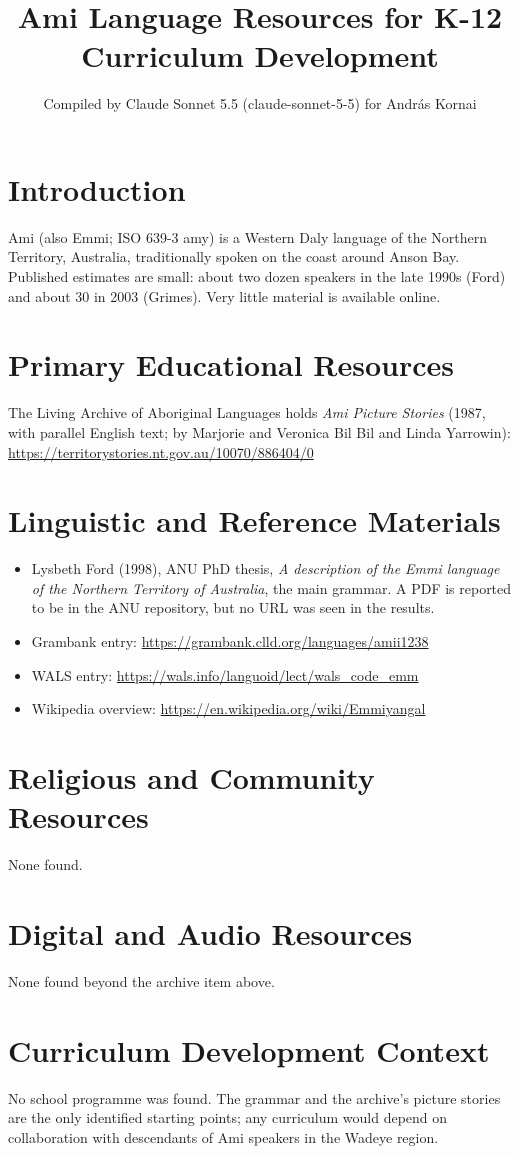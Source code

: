 \documentclass[12pt]{article}
\title{Ami Language Resources for K-12 Curriculum Development}
\author{Compiled by Claude Sonnet 5.5 (claude-sonnet-5-5) for Andr\'as Kornai}
\date{}
\begin{document}
\maketitle

\section{Introduction}
Ami (also Emmi; ISO 639-3 amy) is a Western Daly language of the Northern Territory, Australia, traditionally spoken on the coast around Anson Bay. Published estimates are small: about two dozen speakers in the late 1990s (Ford) and about 30 in 2003 (Grimes). Very little material is available online.

\section{Primary Educational Resources}
The Living Archive of Aboriginal Languages holds \emph{Ami Picture Stories} (1987, with parallel English text; by Marjorie and Veronica Bil Bil and Linda Yarrowin): \url{https://territorystories.nt.gov.au/10070/886404/0}

\section{Linguistic and Reference Materials}
\begin{itemize}
\item Lysbeth Ford (1998), ANU PhD thesis, \emph{A description of the Emmi language of the Northern Territory of Australia}, the main grammar. A PDF is reported to be in the ANU repository, but no URL was seen in the results.
\item Grambank entry: \url{https://grambank.clld.org/languages/amii1238}
\item WALS entry: \url{https://wals.info/languoid/lect/wals_code_emm}
\item Wikipedia overview: \url{https://en.wikipedia.org/wiki/Emmiyangal}
\end{itemize}

\section{Religious and Community Resources}
None found.

\section{Digital and Audio Resources}
None found beyond the archive item above.

\section{Curriculum Development Context}
No school programme was found. The grammar and the archive's picture stories are the only identified starting points; any curriculum would depend on collaboration with descendants of Ami speakers in the Wadeye region.
\end{document}
